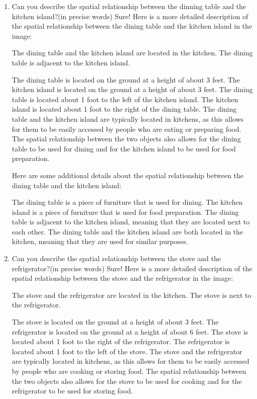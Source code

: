 \begin{enumerate}
    \item Can you describe the spatial relationship between the dinning table and the kitchen island?(in precise words)
    \subitem Sure! Here is a more detailed description of the spatial relationship between the dining table and the kitchen island in the image:

    The dining table and the kitchen island are located in the kitchen. The dining table is adjacent to the kitchen island.
    
    The dining table is located on the ground at a height of about 3 feet.
    The kitchen island is located on the ground at a height of about 3 feet.
    The dining table is located about 1 foot to the left of the kitchen island.
    The kitchen island is located about 1 foot to the right of the dining table.
    The dining table and the kitchen island are typically located in kitchens, as this allows for them to be easily accessed by people who are eating or preparing food. The spatial relationship between the two objects also allows for the dining table to be used for dining and for the kitchen island to be used for food preparation.
    
    Here are some additional details about the spatial relationship between the dining table and the kitchen island:
    
    The dining table is a piece of furniture that is used for dining.
    The kitchen island is a piece of furniture that is used for food preparation.
    The dining table is adjacent to the kitchen island, meaning that they are located next to each other.
    The dining table and the kitchen island are both located in the kitchen, meaning that they are used for similar purposes.
    \item Can you describe the spatial relationship between the stove and the refrigerator?(in precise words)
    \subitem Sure! Here is a more detailed description of the spatial relationship between the stove and the refrigerator in the image:

    The stove and the refrigerator are located in the kitchen. The stove is next to the refrigerator.
    
    The stove is located on the ground at a height of about 3 feet.
    The refrigerator is located on the ground at a height of about 6 feet.
    The stove is located about 1 foot to the right of the refrigerator.
    The refrigerator is located about 1 foot to the left of the stove.
    The stove and the refrigerator are typically located in kitchens, as this allows for them to be easily accessed by people who are cooking or storing food. The spatial relationship between the two objects also allows for the stove to be used for cooking and for the refrigerator to be used for storing food.
    

\end{enumerate}
